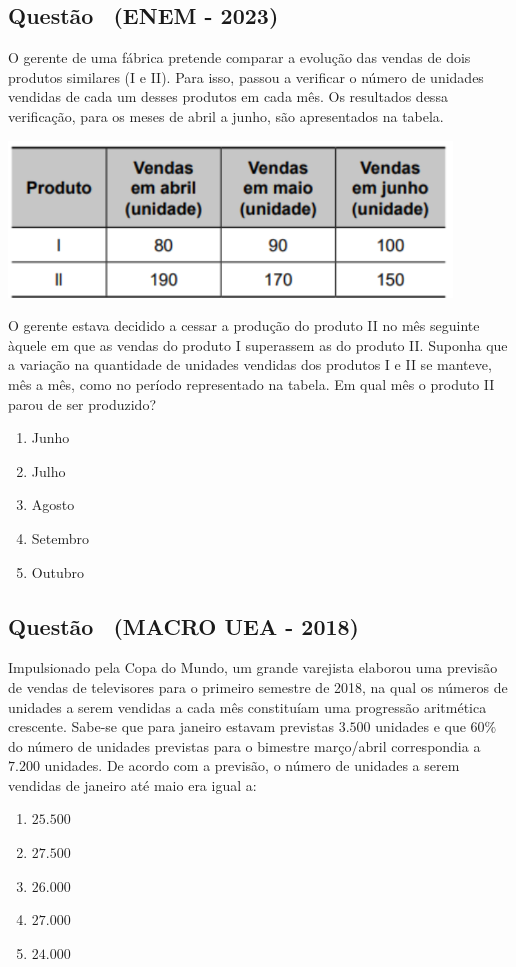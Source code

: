 \documentclass[12pt]{article}
\newcounter{questao}
\newcommand{\novaquestao}[1]{%
  \stepcounter{questao}%
  \subsection*{Questão \thequestao\ (#1)}%
}
\begin{document}
\begin{multicols}{2}
        \novaquestao{ENEM - 2023}
            O gerente de uma fábrica pretende comparar a evolução das vendas de dois produtos similares (I e II). Para isso, passou a verificar o número de unidades vendidas de cada um desses produtos em cada mês. Os resultados dessa verificação, para os meses de abril a junho, são apresentados na tabela. 
            \begin{center}
                \includegraphics[scale=0.6]{q20.png}
            \end{center}O gerente estava decidido a cessar a produção do produto II no mês seguinte àquele em que as vendas do produto I superassem as do produto II. Suponha que a variação na quantidade de unidades vendidas dos produtos I e II se manteve, mês a mês, como no período representado na tabela. Em qual mês o produto II parou de ser produzido?

            
            \begin{enumerate}[label=(\alph*), noitemsep]
                \item Junho
                \item Julho
                \item Agosto
                \item Setembro
                \item Outubro
            \end{enumerate}

        \novaquestao{MACRO UEA - 2018}
            Impulsionado pela Copa do Mundo, um grande varejista elaborou uma previsão de vendas de televisores para o primeiro semestre de 2018, na qual os números de unidades a serem vendidas a cada mês constituíam uma progressão aritmética crescente. Sabe-se que para janeiro estavam previstas $3.500$ unidades e que $60\%$ do número de unidades previstas para o bimestre março/abril correspondia a $7.200$ unidades. De acordo com a previsão, o número de unidades a serem vendidas de janeiro até maio era igual a:

            \begin{enumerate}[label=(\alph*), noitemsep]
                \item $25.500$
                \item $27.500$
                \item $26.000$
                \item $27.000$
                \item $24.000$
            \end{enumerate}


\end{multicols}
\end{document}
